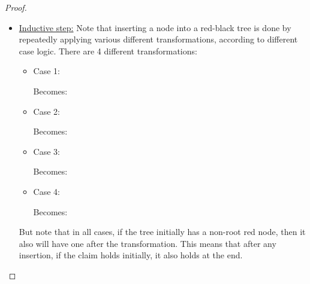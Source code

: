 \documentclass[a4paper,11pt]{scrartcl}
\begin{document}
\begin{proof}
\begin{itemize}
    \item \underline{Inductive step:} Note that inserting a node into a red-black tree is done by repeatedly applying various different transformations, according to different case logic. There are 4 different transformations:
        \begin{itemize}
            \item Case 1: \\
                Becomes:
            \item Case 2: \\
                Becomes:
            \item Case 3: \\
                Becomes:
            \item Case 4: \\
                Becomes:
        \end{itemize}
        But note that in all cases, if the tree initially has a non-root red node, then it also will have one after the transformation. This means that after any insertion, if the claim holds initially, it also holds at the end.
    \end{itemize}
\end{proof}
\end{document}

